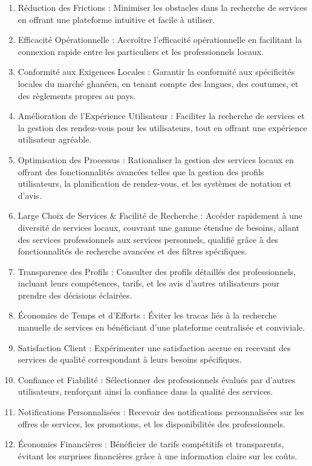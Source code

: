 \begin{enumerate}
    \item Réduction des Frictions : Minimiser les obstacles dans la recherche de services en offrant une plateforme intuitive et facile à utiliser.

    \item Efficacité Opérationnelle : Accroître l'efficacité opérationnelle en facilitant la connexion rapide entre les particuliers et les professionnels locaux.

    \item Conformité aux Exigences Locales : Garantir la conformité aux spécificités locales du marché ghanéen, en tenant compte des langues, des coutumes, et des règlements propres au pays.

    \item Amélioration de l'Expérience Utilisateur : Faciliter la recherche de services et la gestion des rendez-vous pour les utilisateurs, tout en offrant une expérience utilisateur agréable.

    \item Optimisation des Processus : Rationaliser la gestion des services locaux en offrant des fonctionnalités avancées telles que la gestion des profils utilisateurs, la planification de rendez-vous, et les systèmes de notation et d'avis.

    \item Large Choix de Services \& Facilité de Recherche  : Accéder rapidement à une diversité de services locaux, couvrant une gamme étendue de besoins, allant des services professionnels aux services personnels, qualifié grâce à des fonctionnalités de recherche avancées et des filtres spécifiques.

    \item Transparence des Profils : Consulter des profils détaillés des professionnels, incluant leurs compétences, tarifs, et les avis d'autres utilisateurs pour prendre des décisions éclairées.

    \item Économies de Temps et d'Efforts : Éviter les tracas liés à la recherche manuelle de services en bénéficiant d'une plateforme centralisée et conviviale.

    \item Satisfaction Client : Expérimenter une satisfaction accrue en recevant des services de qualité correspondant à leurs besoins spécifiques.

    \item Confiance et Fiabilité : Sélectionner des professionnels évalués par d'autres utilisateurs, renforçant ainsi la confiance dans la qualité des services.

    \item Notifications Personnalisées : Recevoir des notifications personnalisées sur les offres de services, les promotions, et les disponibilités des professionnels.

    \item Économies Financières : Bénéficier de tarifs compétitifs et transparents, évitant les surprises financières grâce à une information claire sur les coûts.

\end{enumerate}

